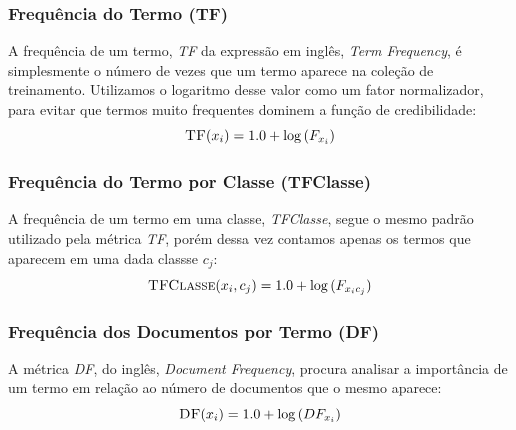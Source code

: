 \subsubsection{Frequência do Termo (TF)}
\label{subsubsection::sumtf}

A frequência de um termo, \textit{TF} da expressão em inglês, \textit{Term Frequency}, é simplesmente o número de vezes que um termo aparece na coleção de treinamento. Utilizamos o logaritmo desse valor como um fator normalizador, para evitar que termos muito frequentes dominem a função de credibilidade:
\begin{equation}\label{eqn::sumtf}
   \textsc{TF}(x_i) = 1.0 + \log{ ( F_{x_i} ) }
\end{equation}


\subsubsection{Frequência do Termo por Classe (TFClasse)}
\label{subsubsection::tf}

A frequência de um termo em uma classe, \textit{TFClasse}, segue o mesmo padrão utilizado pela métrica \textit{TF}, porém dessa vez contamos apenas os termos que aparecem em uma dada classse $c_j$:
\begin{equation}\label{eqn::tf}
  \textsc{TFClasse}(x_i, c_j) = 1.0 + \log{ ( F_{x_ic_j} ) }
\end{equation}


\subsubsection{Frequência dos Documentos por Termo (DF)}
\label{subsubsection::df}

A métrica \textit{DF}, do inglês, \textit{Document Frequency}, procura analisar a importância de um termo em relação ao número de documentos que o mesmo aparece:
\begin{equation}\label{eqn::df}
  \textsc{DF}(x_i) = 1.0 + \log{ ( DF_{x_i} ) }
\end{equation}



